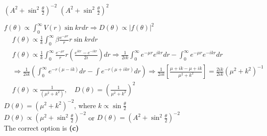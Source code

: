 \begin{enumerate}
\begin{tasks}
	\task[\textbf{C.}]$\left(A^{2}+\sin ^{2} \frac{\theta}{2}\right)^{-2}$
	\task[\textbf{D.}]$\left(A^{2}+\sin ^{2} \frac{\theta}{2}\right)^{2}$
\end{tasks}
\begin{answer}
	$f(\theta) \propto \int_{0}^{\infty} V(r) \sin k r d r \Rightarrow D(\theta) \propto|f(\theta)|^{2}$
	\begin{align*}
		&f(\theta) \propto \frac{1}{k} \int_{0}^{\infty} \beta \frac{e^{-\mu r}}{r} r \sin k r d r \\
		&f(\theta) \propto \frac{1}{k} \int_{0}^{\infty} \frac{e^{-\mu r}}{r} r\left(\frac{e^{i k r}-e^{-i k r}}{2 i}\right) d r \Rightarrow \frac{1}{2 i k} \int_{0}^{\infty} e^{-\mu r} e^{i k r} d r-\int_{0}^{\infty} e^{-\mu r} e^{-i k r} d r \\
		&\Rightarrow \frac{1}{2 i k}\left(\int_{0}^{\infty} e^{-r(\mu-i k)} d r-\int e^{-r(\mu+i k r)} d r\right) \Rightarrow \frac{1}{2 i k}\left[\frac{\mu+i k-\mu+i k}{\mu^{2}+k^{2}}\right]=\frac{2 i k}{2 i k}\left(\mu^{2}+k^{2}\right)^{-1} \\
		&f(\theta) \propto \frac{1}{\left(\mu^{2}+k^{2}\right)}, \quad D(\theta)=\left(\frac{1}{\mu^{2}+k^{2}}\right)^{2}
	\end{align*}
	$D(\theta)=\left(\mu^{2}+k^{2}\right)^{-2}$, where $k \propto \sin \frac{\theta}{2}$\\
	$D(\theta) \propto\left(\mu^{2}+\sin ^{2} \frac{\theta}{2}\right)^{-2}$ or $D(\theta)=\left(A^{2}+\sin ^{2} \frac{\theta}{2}\right)^{-2}$\\
	The correct option is \textbf{(c)}
\end{answer}
\end{enumerate}